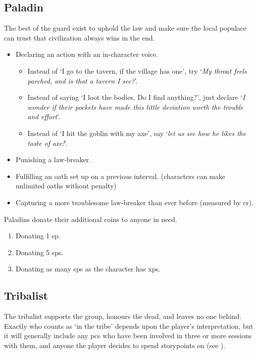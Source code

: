 \begin{multicols}{2}
\subsection{Paladin}
\label{paladin}

The best of the \gls{guard} exist to uphold the law and make sure the local populace can trust that civilization always wins in the end.

\begin{itemize}
  \item
  Declaring an action with an in-character voice.
  \begin{itemize}
    \item
    Instead of `I go to the tavern, if the \gls{village} has one', try `\textit{My throat feels parched, and is that a tavern I see?}'.
    \item
    Instead of saying `I loot the bodies. Do I find anything?', just declare `\textit{I wonder if their pockets have made this little deviation worth the trouble and effort}'.
    \item
    Instead of `I hit the goblin with my axe', say `\textit{let us see how he likes the taste of axe!}'.
  \end{itemize}
  \item
  Punishing a law-breaker.
  \item
  Fulfilling an oath set up on a previous \gls{interval}.
  (characters can make unlimited oaths without penalty)
  \item
  Capturing a more troublesome law-breaker than ever before (measured by \gls{cr}).
\end{itemize}

Paladins donate their additional coins to anyone in need.

\begin{enumerate}
  \item
  Donating 1 \gls{sp}.
  \item
  Donating 5 \glspl{sp}.
  \item
  Donating as many \glspl{sp} as the character has \glspl{xp}.
\end{enumerate}


\subsection{Tribalist}
\label{tribalist}

The tribalist supports the group, honours the dead, and leaves no one behind.
Exactly who counts as `in the tribe' depends upon the player's interpretation, but it will generally include any \glspl{pc} who have been involved in three or more sessions with them, and anyone the player decides to spend \glspl{storypoint} on (see ).


\end{multicols}
